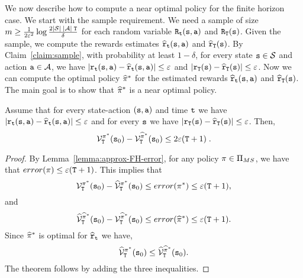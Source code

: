 We now describe how to compute a near optimal policy for the finite
horizon case. We start with the sample requirement. We need a sample
of size $m\geq \frac{1}{2\varepsilon^2}\log
\frac{2|\mathcal{S}|\;|\mathcal{A}|\; {\tt T}}{\delta}$ for each random
variable ${\tt R}_{\tt t}({\tt s},{\tt a})$ and
${\tt R}_{\tt T}({\tt s})$. 
Given the sample, we compute the
rewards estimates $\widehat{{\tt r}}_{\tt t}({\tt s},{\tt a})$ and
$\widehat{{\tt r}}_{\tt T}({\tt s})$. By Claim~\ref{claim:sample},
with probability at least $1-\delta$, for every state ${\tt s}\in\mathcal{S}$ and action
${\tt a} \in\mathcal{A}$, we have
$|{\tt r}_{\tt t}({\tt s},{\tt a})-\widehat{{\tt r}}_{\tt t}({\tt s},{\tt a})|\leq
\varepsilon$ and
$|{\tt r}_{\tt T}({\tt s})-\widehat{{\tt r}}_{\tt T}({\tt s})|\leq\varepsilon$.
Now we can compute the optimal policy $\widehat{\pi}^*$ for the
estimated rewards $\widehat{{\tt r}}_{\tt t}({\tt s},{\tt a})$ and
$\widehat{{\tt r}}_{\tt T}({\tt s})$. The main goal is to show that
$\widehat{\pi}^*$ is a near optimal policy.

\begin{theorem}
Assume that for every state-action $({\tt s},{\tt a})$ and time ${\tt t}$ we have
$|{\tt r}_{\tt t}({\tt s},{\tt a})-\widehat{{\tt r}}_{\tt t}({\tt s},{\tt a})|\leq
\varepsilon$ and for every ${\tt s}$ we have
$|{\tt r}_{\tt T}({\tt s})-\widehat{{\tt r}}_{\tt T}({\tt s})|\leq\varepsilon$.
Then,
\[
\mathcal{V}^{\pi^*}_{\tt T}({\tt s}_0) -
\mathcal{V}^{\widehat{\pi}^*}_{\tt T} ({\tt s}_0) \leq
2\varepsilon({\tt T}+1)\;.
\]
\end{theorem}

\begin{proof}
By Lemma~\ref{lemma:approx-FH-error},  for any policy $\pi \in  {\Pi _{MS}}$, we
have that $error(\pi)\leq \varepsilon({\tt T}+1)$. This
implies that
\[
\mathcal{V}^{\pi^*}_{\tt T}({\tt s}_0)-
\widehat{\mathcal{V}}^{\pi^*}_{\tt T}({\tt s}_0)\leq
error(\pi^*)\leq \varepsilon({\tt T}+1),
\]
and
\[
\widehat{\mathcal{V}}^{\widehat{\pi}^*}_{\tt T}({\tt s}_0)-
\mathcal{V}^{\widehat{\pi}^*}_{\tt T}({\tt s}_0)\leq
error(\widehat{\pi}^*)\leq \varepsilon({\tt T}+1) .
\]
Since $\widehat{\pi}^*$ is optimal for
$\widehat{{\tt r}}_{\tt t}$ we have,
\[
\widehat{\mathcal{V}}^{\pi^*}_{\tt T}({\tt s}_0)\leq
\widehat{\mathcal{V}}^{\widehat{\pi}^*}_{\tt T}({\tt s}_0) .
\]
The theorem follows by adding the three inequalities.
\end{proof}


